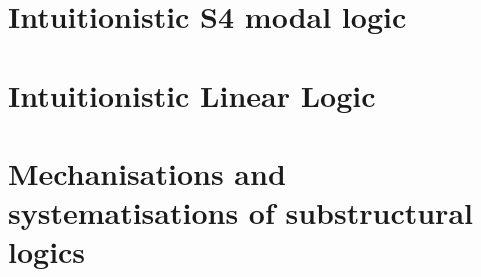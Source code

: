 \section{Intuitionistic S4 modal logic}\label{sec:modal}


\section{Intuitionistic Linear Logic}\label{sec:ill}


\section{Mechanisations and systematisations of substructural logics}
\label{sec:linmech}


